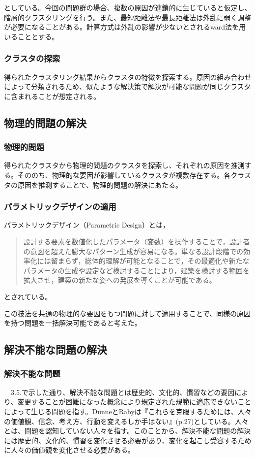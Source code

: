 \documentclass{jsarticle}
\begin{document}
としている。今回の問題群の場合、複数の原因が連鎖的に生じていると仮定し、階層的クラスタリングを行う。また、最短距離法や最長距離法は外乱に弱く調整が必要になることがある。計算方式は外乱の影響が少ないとされるward法を用いることとする。



\subsubsection{クラスタの探索}
得られたクラスタリング結果からクラスタの特徴を探索する。原因の組み合わせによって分類されるため、似たような解決策で解決が可能な問題が同じクラスタに含まれることが想定される。

\newpage
\subsection{物理的問題の解決}
\subsubsection{物理的問題}

得られたクラスタから物理的問題のクラスタを探索し、それぞれの原因を推測する。そののち、物理的な要因が影響しているクラスタが複数存在する。各クラスタの原因を推測することで、物理的問題の解決にあたる。

\subsubsection{パラメトリックデザインの適用}
パラメトリックデザイン（Parametric Design）\cite{Parametric}とは，
\begin{quotation}
設計する要素を数値化したパラメータ（変数）を操作することで，設計者の意図を超えた膨大なパターン生成が容易になる。単なる設計段階での効率化には留まらず，総体的理解が可能となることで，その最適化や新たなパラメータの生成や設定など検討することにより，建築を検討する範囲を拡大させ，建築の新たな姿への発展を導くことが可能である。
\end{quotation}

とされている。

この技法を共通の物理的な要因をもつ問題に対して適用することで、同様の原因を持つ問題を一括解決可能であると考えた。
\newpage
\subsection{解決不能な問題の解決}

\subsubsection{解決不能な問題}
　3.5.で示した通り、解決不能な問題とは歴史的、文化的、慣習などの要因により、変更することが困難になった概念により規定された規範に適応できないことによって生じる問題を指す。DunneとRaby\cite{Speculative}は『これらを克服するためには、人々の価値観、信念、考え方、行動を変えるしか手はない』(p.27)としている。人々とは、問題を認知していない人々を指す。このことから、解決不能な問題の解決には歴史的、文化的、慣習を変化させる必要があり、変化を起こし受容するために人々の価値観を変化させる必要がある。
\end{document}
